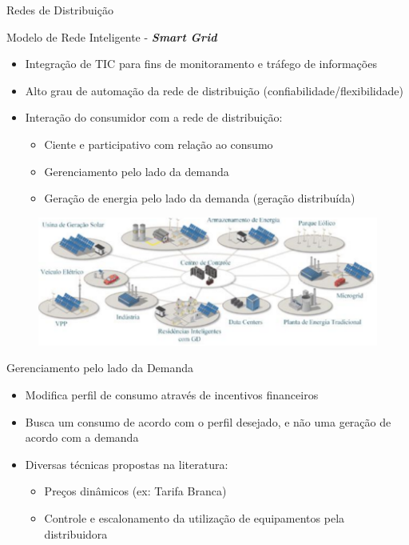 \begin{frame}{Redes de Distribuição}
  \begin{block}{Modelo de Rede Inteligente - \textbf{\textit{Smart Grid}}}
    \begin{itemize}
      \item Integração de \alert{TIC} para fins de monitoramento e tráfego de
      informações
      \item Alto grau de \alert{automação} da rede de distribuição
      (confiabilidade/flexibilidade)
      \item \alert{Interação do consumidor} com a rede de distribuição:
      \begin{itemize}
        \item Ciente e participativo com relação ao consumo
        \item Gerenciamento pelo lado da demanda
        \item Geração de energia pelo lado da demanda (geração distribuída)
      \end{itemize}
    \end{itemize}
  \end{block}
  \begin{figure}[h]
  	\begin{center}
      \includegraphics [scale=0.27]{./Figures/SmartGrid}
  	\end{center}
  \end{figure}
\end{frame}

\begin{frame}
  \begin{block}{Gerenciamento pelo lado da Demanda}
    \begin{itemize}
      \item Modifica perfil de consumo através de incentivos financeiros
      \item Busca um consumo de acordo com o perfil desejado, e não uma geração
      de acordo com a demanda
      \item Diversas técnicas propostas na literatura:
      \begin{itemize}
        \item Preços dinâmicos (ex: Tarifa Branca)
        \item Controle e escalonamento da utilização de equipamentos pela
        distribuidora
      \end{itemize}
    \end{itemize}
  \end{block}
\end{frame}

